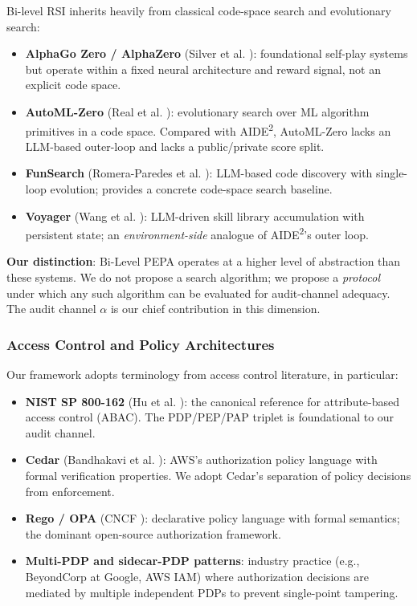 \documentclass{article}
\theoremstyle{definition}
\begin{document}
Bi-level RSI inherits heavily from classical code-space search and evolutionary search:
\begin{itemize}
    \item \textbf{AlphaGo Zero / AlphaZero} (Silver et al. \cite{silver2017mastering, silver2018alphazero}): foundational self-play systems but operate within a fixed neural architecture and reward signal, not an explicit code space.
    \item \textbf{AutoML-Zero} (Real et al. \cite{real2020automl}): evolutionary search over ML algorithm primitives in a code space. Compared with AIDE\textsuperscript{2}, AutoML-Zero lacks an LLM-based outer-loop and lacks a public/private score split.
    \item \textbf{FunSearch} (Romera-Paredes et al. \cite{romeraparedes2023mathematical}): LLM-based code discovery with single-loop evolution; provides a concrete code-space search baseline.
    \item \textbf{Voyager} (Wang et al. \cite{wang2023voyager}): LLM-driven skill library accumulation with persistent state; an \emph{environment-side} analogue of AIDE\textsuperscript{2}'s outer loop.
\end{itemize}

\textbf{Our distinction}: Bi-Level PEPA operates at a higher level of abstraction than these systems. We do not propose a search algorithm; we propose a \emph{protocol} under which any such algorithm can be evaluated for audit-channel adequacy. The audit channel $\alpha$ is our chief contribution in this dimension.

\subsubsection{Access Control and Policy Architectures}

Our framework adopts terminology from access control literature, in particular:
\begin{itemize}
    \item \textbf{NIST SP 800-162} (Hu et al. \cite{nist2014abac}): the canonical reference for attribute-based access control (ABAC). The PDP/PEP/PAP triplet is foundational to our audit channel.
    \item \textbf{Cedar} (Bandhakavi et al. \cite{bandhakavi2008cedar}): AWS's authorization policy language with formal verification properties. We adopt Cedar's separation of policy decisions from enforcement.
    \item \textbf{Rego / OPA} (CNCF \cite{cncf2021opa}): declarative policy language with formal semantics; the dominant open-source authorization framework.
    \item \textbf{Multi-PDP and sidecar-PDP patterns}: industry practice (e.g., BeyondCorp at Google, AWS IAM) where authorization decisions are mediated by multiple independent PDPs to prevent single-point tampering.
\end{itemize}
\end{document}
